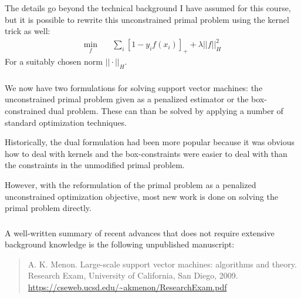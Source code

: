 \documentclass[xetex,mathserif,serif,aspectratio=169]{beamer}
\begin{document}
\begin{frame}[fragile] \frametitle{} \oldB \small

\textbf{}

The details go beyond the technical background I have assumed
for this course, but it is possible to rewrite this unconstrained
primal problem using the kernel trick as well:
\begin{align*}
\min_f \quad & \sum_i \left[ 1 - y_i f(x_i) \right]_{+} + \lambda ||f ||_H^2
\end{align*}
For a suitably chosen norm $|| \cdot ||_H$.

\end{frame}

\begin{frame}[fragile] \frametitle{} \oldB \small

\textbf{}

We now have two formulations for solving support vector machines:
the unconstrained primal problem given as a penalized estimator or
the box-constrained dual problem. These can than be solved by
applying a number of standard optimization techniques.

Historically, the dual formulation had been more popular because
it was obvious how to deal with kernels and the box-constraints
were easier to deal with than the constraints in the unmodified
primal problem.

However, with the reformulation of the primal problem as a penalized
unconstrained optimization objective, most new work is done on solving
the primal problem directly.

\end{frame}


\begin{frame}[fragile] \frametitle{} \oldB \small

\textbf{}

A well-written summary of recent advances that does not
require extensive background knowledge is the following
unpublished manuscript:

\begin{quote}
A. K. Menon. Large-scale support vector machines: algorithms and theory. Research Exam, University of California, San Diego, 2009. \url{https://cseweb.ucsd.edu/~akmenon/ResearchExam.pdf}
\end{quote}

\end{frame}
\end{document}
